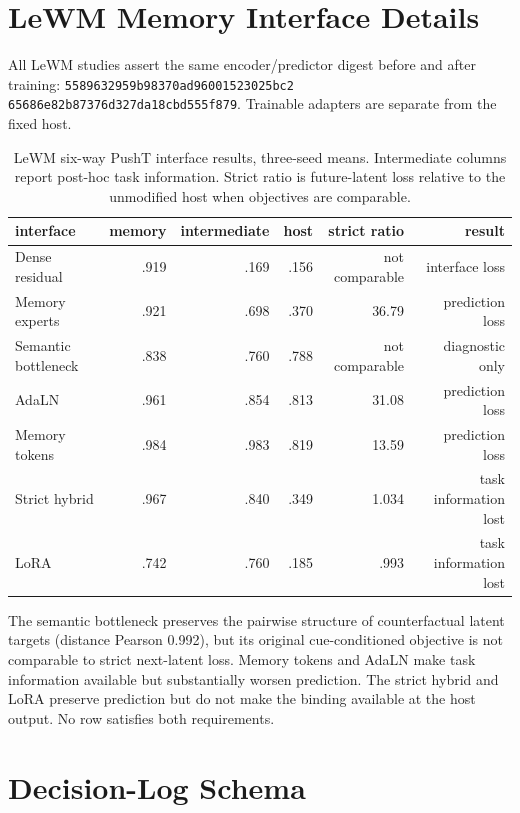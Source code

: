 \section{LeWM Memory Interface Details}
\label{app:lewm}

All LeWM studies assert the same encoder/predictor digest before and after
training:
\texttt{5589632959b98370ad96001523025bc2}\allowbreak
\texttt{65686e82b87376d327da18cbd555f879}.
Trainable adapters are separate from the fixed host.

\begin{table}[h]
\centering\scriptsize
\caption{LeWM six-way PushT interface results, three-seed means. Intermediate
columns report post-hoc task information. Strict ratio is future-latent loss
relative to the unmodified host when objectives are comparable.}
\label{tab:lewm-full}
\begin{tabular}{lrrrrr}
\toprule
interface & memory & intermediate & host & strict ratio & result\\
\midrule
Dense residual & .919 & .169 & .156 & not comparable & interface loss\\
Memory experts & .921 & .698 & .370 & 36.79 & prediction loss\\
Semantic bottleneck & .838 & .760 & .788 & not comparable & diagnostic only\\
AdaLN & .961 & .854 & .813 & 31.08 & prediction loss\\
Memory tokens & .984 & .983 & .819 & 13.59 & prediction loss\\
Strict hybrid & .967 & .840 & .349 & 1.034 & task information lost\\
LoRA & .742 & .760 & .185 & .993 & task information lost\\
\bottomrule
\end{tabular}
\end{table}

The semantic bottleneck preserves the pairwise structure of counterfactual
latent targets (distance Pearson 0.992), but its original cue-conditioned
objective is not comparable to strict next-latent loss. Memory tokens and
AdaLN make task information available but substantially worsen prediction.
The strict hybrid and LoRA preserve prediction but do not make the binding
available at the host output. No row satisfies both requirements.

\section{Decision-Log Schema}
\label{app:logs}


